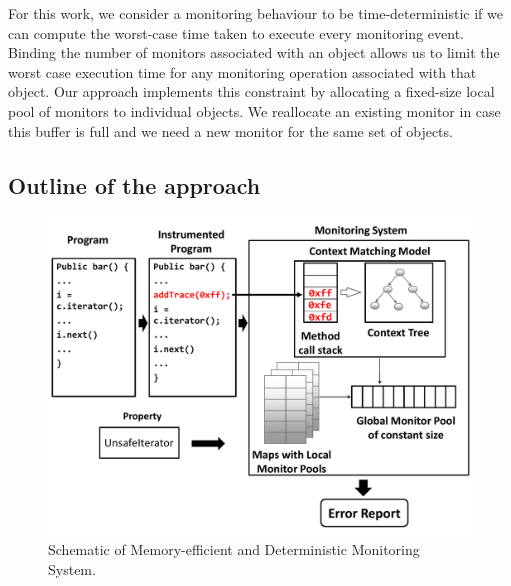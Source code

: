 For this work, we consider a monitoring behaviour to be time-deterministic if we can compute the 
worst-case time taken to execute every monitoring event. Binding the number of 
monitors associated with an object allows us to limit the worst case execution 
time for any monitoring operation associated with that object. Our approach 
implements this constraint by allocating a fixed-size local pool of monitors to 
individual objects. We reallocate an existing monitor in case this buffer is full and we need a new
monitor for the same set of objects.


\subsection{Outline of the approach}
\label{subsec:outline}

\begin{figure}[t]
\centering
  \includegraphics[scale=0.4, trim= 2cm 1cm 0 1cm]{./images/schematic.pdf}
  \caption[Schematic of Memory-efficient and Deterministic Monitoring 
System]{Schematic of Memory-efficient and Deterministic Monitoring System.}
  \label{fig:schematic}
\end{figure}

